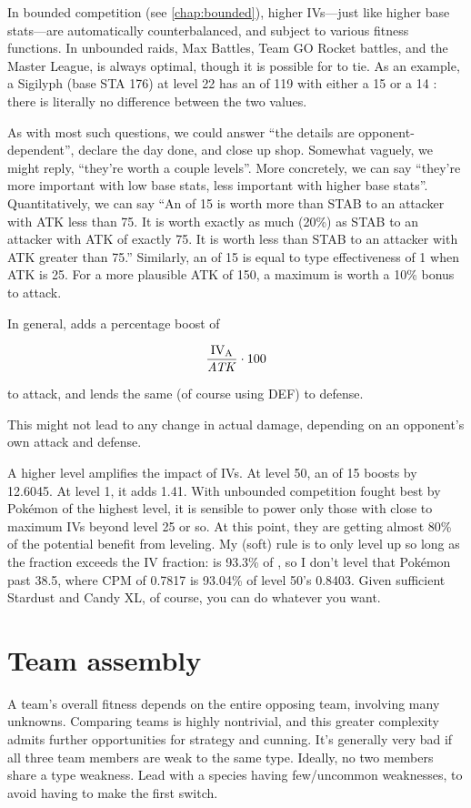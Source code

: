 In bounded competition (see \autoref{chap:bounded}), higher IVs---just like higher
  base stats---are automatically counterbalanced, and subject to various fitness functions.
In unbounded raids, Max Battles, Team GO Rocket battles, and the Master League,
   is always optimal, though it is possible for  to tie.
As an example, a Sigilyph (base STA 176) at level 22 has an \MHP{} of 119 with
  either a 15 or a 14 : there is literally no difference between the two values.

As with most such questions, we could answer ``the details are opponent-dependent'',
  declare the day done, and close up shop.
Somewhat vaguely, we might reply, ``they're worth a couple levels''.
More concretely, we can say ``they're more important with low base stats, less important
  with higher base stats''.
Quantitatively, we can say ``An  of 15 is worth more than STAB to an
  attacker with ATK less than 75. It is worth exactly as much (20\%) as STAB
  to an attacker with ATK of exactly 75. It is worth less than STAB
  to an attacker with ATK greater than 75.''
Similarly, an  of 15 is equal to type effectiveness of 1 when ATK is 25.
For a more plausible ATK of 150, a maximum  is worth a 10\% bonus to attack.

In general,  adds a percentage boost of

\[ \frac{\mbox{$\mathrm{IV_{A}}$}}{\mathit{ATK}} \cdot 100 \]

\noindent{}to attack, and  lends the same (of course using DEF) to defense.

This might not lead to any change in actual damage, depending on an opponent's own attack and defense.

A higher level amplifies the impact of IVs.
At level 50, an  of 15 boosts  by 12.6045.
At level 1, it adds 1.41.
With unbounded competition fought best by Pokémon of the highest level, it is
 sensible to power only those with close to maximum IVs beyond level 25 or so.
At this point, they are getting almost 80\% of the potential benefit from leveling.
My (soft) rule is to only level up so long as the \CPM fraction exceeds the IV fraction:
  is 93.3\% of , so I don't level that Pokémon
 past 38.5, where CPM of 0.7817 is 93.04\% of level 50's 0.8403.
Given sufficient Stardust and Candy XL, of course, you can do whatever you want.

\section{Team assembly}
A team's overall fitness depends on the entire opposing team, involving many unknowns.
Comparing teams is highly nontrivial, and this greater complexity admits
 further opportunities for strategy and cunning.
It's generally very bad if all three team members are weak to the same type.
Ideally, no two members share a type weakness.
Lead with a species having few/uncommon weaknesses, to avoid having to make the first switch.


